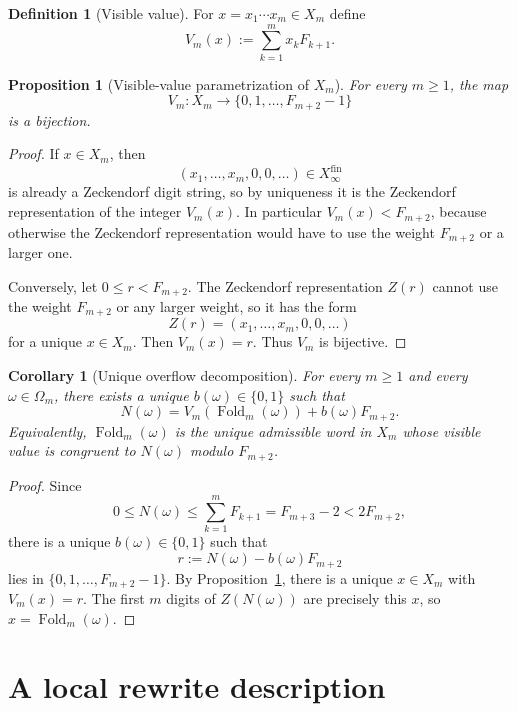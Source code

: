 \documentclass[11pt,letterpaper]{article}
\numberwithin{equation}{section}
\theoremstyle{plain}
\newtheorem{proposition}[theorem]{Proposition}
\newtheorem{corollary}[theorem]{Corollary}
\theoremstyle{definition}
\newtheorem{definition}[theorem]{Definition}
\theoremstyle{remark}
\newcommand{\Xfin}{X_\infty^{\mathrm{fin}}}
\DeclareMathOperator{\Fold}{Fold}
\begin{document}
\begin{definition}[Visible value]
\label{def:visible-value}
For $x=x_1\cdots x_m\in X_m$ define
\[
V_m(x):=\sum_{k=1}^m x_kF_{k+1}.
\]
\end{definition}

\begin{proposition}[Visible-value parametrization of $X_m$]
\label{prop:visible-value-parametrization}
For every $m\ge 1$, the map
\[
V_m:X_m\to \{0,1,\ldots,F_{m+2}-1\}
\]
is a bijection.
\end{proposition}

\begin{proof}
If $x\in X_m$, then
\[
(x_1,\ldots,x_m,0,0,\ldots)\in \Xfin
\]
is already a Zeckendorf digit string, so by uniqueness it is the Zeckendorf
representation of the integer $V_m(x)$.  In particular $V_m(x)<F_{m+2}$,
because otherwise the Zeckendorf representation would have to use the weight
$F_{m+2}$ or a larger one.

Conversely, let $0\le r<F_{m+2}$.  The Zeckendorf representation $Z(r)$ cannot
use the weight $F_{m+2}$ or any larger weight, so it has the form
\[
Z(r)=(x_1,\ldots,x_m,0,0,\ldots)
\]
for a unique $x\in X_m$.  Then $V_m(x)=r$.  Thus $V_m$ is bijective.
\end{proof}

\begin{corollary}[Unique overflow decomposition]
\label{cor:visible-value-overflow}
For every $m\ge 1$ and every $\omega\in\Omega_m$, there exists a unique
$b(\omega)\in\{0,1\}$ such that
\[
N(\omega)=V_m(\Fold_m(\omega))+b(\omega)F_{m+2}.
\]
Equivalently, $\Fold_m(\omega)$ is the unique admissible word in $X_m$ whose
visible value is congruent to $N(\omega)$ modulo $F_{m+2}$.
\end{corollary}

\begin{proof}
Since
\[
0\le N(\omega)\le \sum_{k=1}^m F_{k+1}=F_{m+3}-2<2F_{m+2},
\]
there is a unique $b(\omega)\in\{0,1\}$ such that
\[
r:=N(\omega)-b(\omega)F_{m+2}
\]
lies in $\{0,1,\ldots,F_{m+2}-1\}$.  By
Proposition~\ref{prop:visible-value-parametrization}, there is a unique
$x\in X_m$ with $V_m(x)=r$.  The first $m$ digits of $Z(N(\omega))$ are
precisely this $x$, so $x=\Fold_m(\omega)$.
\end{proof}

\section{A local rewrite description}
\end{document}
